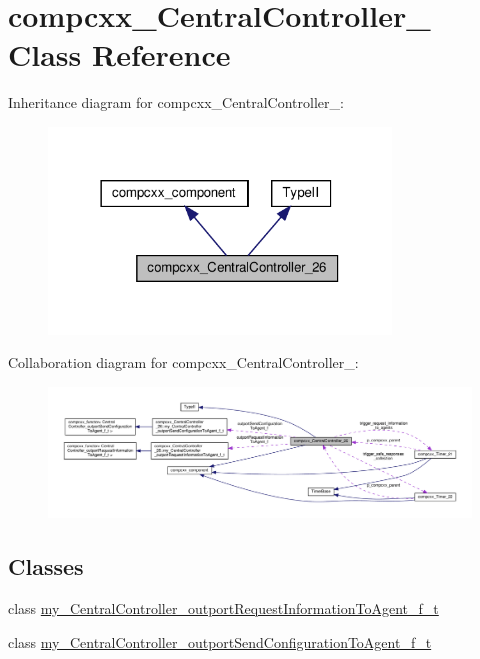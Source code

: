\hypertarget{classcompcxx__CentralController__26}{}\section{compcxx\+\_\+\+Central\+Controller\+\_ Class Reference}
\label{classcompcxx__CentralController__26}


Inheritance diagram for compcxx\+\_\+\+Central\+Controller\+\_\+:\nopagebreak
\begin{figure}[H]
\begin{center}
\leavevmode
\includegraphics[width=258pt]{classcompcxx__CentralController__26__inherit__graph}
\end{center}
\end{figure}


Collaboration diagram for compcxx\+\_\+\+Central\+Controller\+\_\+:\nopagebreak
\begin{figure}[H]
\begin{center}
\leavevmode
\includegraphics[width=350pt]{classcompcxx__CentralController__26__coll__graph}
\end{center}
\end{figure}
\subsection*{Classes}
\begin{DoxyCompactItemize}
\item 
class \hyperlink{classcompcxx__CentralController__26_1_1my__CentralController__outportRequestInformationToAgent__f__t}{my\+\_\+\+Central\+Controller\+\_\+outport\+Request\+Information\+To\+Agent\+\_\+f\+\_\+t}
\item 
class \hyperlink{classcompcxx__CentralController__26_1_1my__CentralController__outportSendConfigurationToAgent__f__t}{my\+\_\+\+Central\+Controller\+\_\+outport\+Send\+Configuration\+To\+Agent\+\_\+f\+\_\+t}
\end{DoxyCompactItemize}
